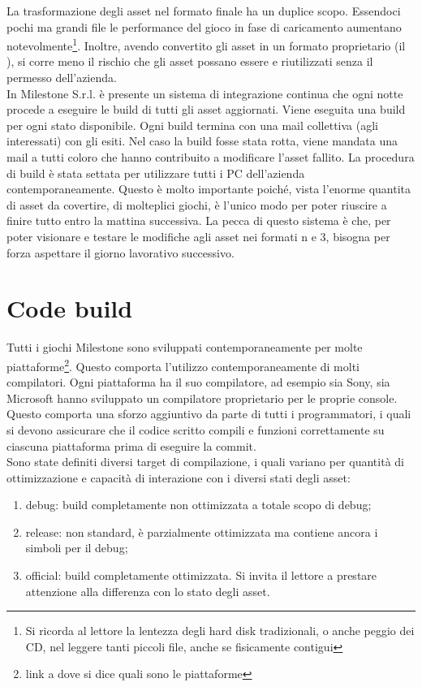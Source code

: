 La trasformazione degli asset nel formato finale ha un duplice scopo. Essendoci pochi ma grandi file le performance del gioco in fase di caricamento aumentano notevolmente\footnote{Si ricorda al lettore la lentezza degli hard disk tradizionali, o anche peggio dei CD, nel leggere tanti piccoli file, anche se fisicamente contigui}. Inoltre, avendo convertito gli asset in un formato proprietario (il ), si corre meno il rischio che gli asset possano essere  e riutilizzati senza il permesso dell'azienda.\\

In Milestone S.r.l. è presente un \gls{sistema di integrazione continua} che ogni notte procede a eseguire le \gls{build} di tutti gli asset aggiornati. Viene eseguita una build per ogni stato disponibile. Ogni build termina con una mail collettiva (agli interessati) con gli esiti. Nel caso la build fosse stata rotta, viene mandata una mail a tutti coloro che hanno contribuito a modificare l'asset fallito. La procedura di build è stata settata per utilizzare tutti i PC dell'azienda contemporaneamente. Questo è molto importante poiché, vista l'enorme quantita di asset da covertire, di molteplici giochi, è l'unico modo per poter riuscire a finire tutto entro la mattina successiva. La pecca di questo sistema è che, per poter visionare e testare le modifiche agli asset nei formati n e 3, bisogna per forza aspettare il giorno lavorativo successivo.

\section{Code build}

Tutti i giochi Milestone sono sviluppati contemporaneamente per molte piattaforme\footnote{link a dove si dice quali sono le piattaforme}. Questo comporta l'utilizzo contemporaneamente di molti compilatori. Ogni piattaforma ha il suo compilatore, ad esempio sia Sony, sia Microsoft hanno sviluppato un compilatore proprietario per le proprie console. Questo comporta una sforzo aggiuntivo da parte di tutti i programmatori, i quali si devono assicurare che il codice scritto compili e funzioni correttamente su ciascuna piattaforma prima di eseguire la commit.\\

Sono state definiti diversi target di compilazione, i quali variano per quantità di ottimizzazione e capacità di interazione con i diversi stati degli asset:
\begin{enumerate}
	\item debug: build completamente non ottimizzata a totale scopo di debug;
	\item release: non standard, è parzialmente ottimizzata ma contiene ancora i simboli per il debug;
	\item official: build completamente ottimizzata. Si invita il lettore a prestare attenzione alla differenza con lo stato  degli asset.
\end{enumerate}

